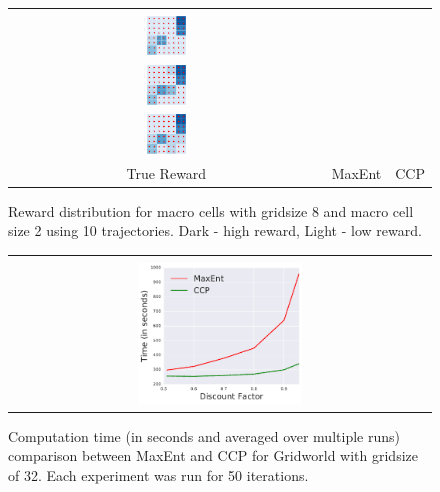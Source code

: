\documentclass{article}
\def\MSHangBox#1{%
\begin{minipage}[t]{\textwidth}%
\begin{tabbing} %
~\\[-\baselineskip] %
#1 %
\end{tabbing}%
\end{minipage}} %
\begin{document}
\begin{figure}[t]
\centering
  \begin{tabular}{ccc}
    \MSHangBox{\includegraphics[width=0.13\textwidth]{images/gridworld/macro_cells/grid_8_macro_2/reward_map/true_reward_trim.pdf}}&
    \MSHangBox{\includegraphics[width=0.13\textwidth]{images/gridworld/macro_cells/grid_8_macro_2/reward_map/maxent_reward_trim.pdf}}&
    \MSHangBox{\includegraphics[width=0.13\textwidth]{images/gridworld/macro_cells/grid_8_macro_2/reward_map/ccp_reward_2_trim.pdf}} \\
    True Reward & MaxEnt & CCP \\
    \end{tabular}
    \caption{ Reward distribution for macro cells with gridsize 8 and macro cell size 2 using 10 trajectories. Dark - high reward, Light - low reward. }
    \label{fig:img_reward_map_gridworld_macro_cell}
\end{figure}

\begin{figure}[t]
\centering
  \begin{tabular}{c}
    \MSHangBox{\includegraphics[width=0.4\textwidth]{images/gridworld/fixed_target_wind_30/timeit_maxent_vs_ccp_grid_32_per_discount.pdf}}
  \end{tabular}
    \caption{Computation time (in seconds and averaged over multiple runs) comparison between MaxEnt and CCP for Gridworld with gridsize of 32. Each experiment was run for 50 iterations. }
    \label{fig:img_gridworld_maxent_vs_ccp_time_discount}
\end{figure}
\end{document}
